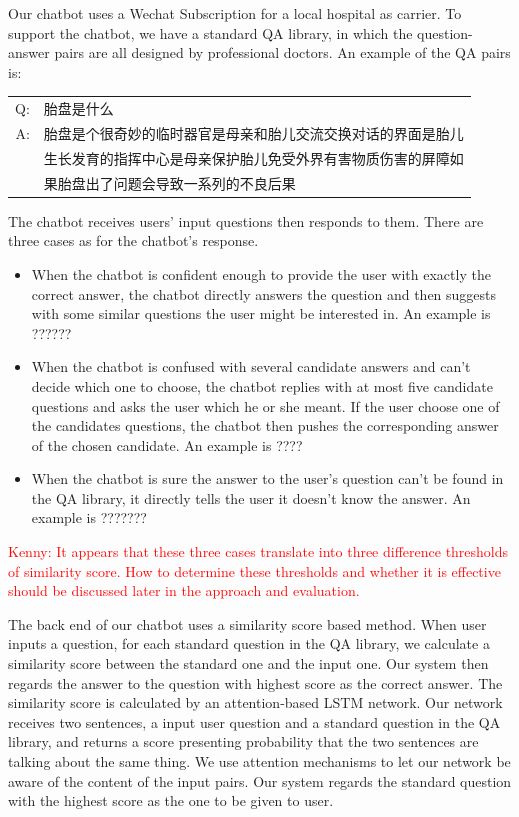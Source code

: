 \documentclass[a4paper,10pt]{article}
\newcommand{\KZ}[1]{\textcolor{red}{Kenny: #1}}
\begin{document}
Our chatbot uses a Wechat Subscription for a local hospital as carrier. To support the chatbot, we have a standard QA library, in which the question-answer pairs are all designed by professional doctors. An example of the QA pairs is: 
\begin{center}
\begin{CJK}{UTF8}{gbsn}
\begin{tabular}{rl}
Q:&胎盘是什么 \\
A:&胎盘是个很奇妙的临时器官是母亲和胎儿交流交换对话的界面是胎儿 \\
  &生长发育的指挥中心是母亲保护胎儿免受外界有害物质伤害的屏障如 \\
  &果胎盘出了问题会导致一系列的不良后果 \\
\end{tabular}
\end{CJK}
\end{center}
The chatbot receives users' input questions then responds to them. There are three cases as for the chatbot's response.
\begin{itemize}
\item When the chatbot is confident enough to provide the user with exactly the correct answer, the chatbot directly answers the question and then suggests with some similar questions the user might be interested in. An example is ??????
\item When the chatbot is confused with several candidate answers and can't decide which one to choose, the chatbot replies with at most five candidate questions and asks the user which he or she meant. If the user choose one of the candidates questions, the chatbot then pushes the corresponding answer of the chosen candidate. An example is ????
\item When the chatbot is sure the answer to the user's question can't be found in the QA library, it directly tells the user it doesn't know the answer. An example is ???????
\end{itemize}
\KZ{It appears that these three cases translate into three difference thresholds
of similarity score. How to determine these thresholds and whether it is effective should be discussed later in the approach and evaluation.}

The back end of our chatbot uses a similarity score based method. When user inputs a question, for each standard question in the QA library, we calculate a similarity score between the standard one and the input one. Our system then regards the answer to the question with highest score as the correct answer. The similarity score is calculated by an attention-based LSTM network. Our network receives two sentences, a input user question and a standard question in the QA library, and returns a score presenting probability that the two sentences are talking about the same thing. We use attention mechanisms to let our network be aware of the content of the input pairs. Our system regards the standard question with the highest score as the one to be given to user.
\end{document}
